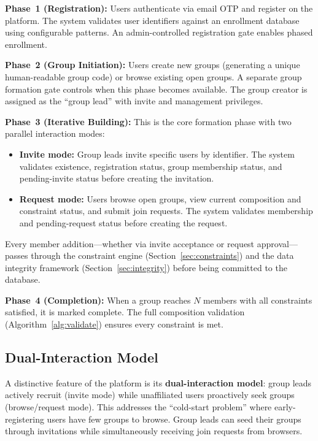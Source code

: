 \documentclass[11pt,a4paper]{article}
\theoremstyle{plain}
\theoremstyle{definition}
\begin{document}
\textbf{Phase~1 (Registration):} Users authenticate via email OTP and register on the platform. The system validates user identifiers against an enrollment database using configurable patterns. An admin-controlled registration gate enables phased enrollment.

\textbf{Phase~2 (Group Initiation):} Users create new groups (generating a unique human-readable group code) or browse existing open groups. A separate group formation gate controls when this phase becomes available. The group creator is assigned as the ``group lead'' with invite and management privileges.

\textbf{Phase~3 (Iterative Building):} This is the core formation phase with two parallel interaction modes:
\begin{itemize}[noitemsep,topsep=3pt]
    \item \textbf{Invite mode:} Group leads invite specific users by identifier. The system validates existence, registration status, group membership status, and pending-invite status before creating the invitation.
    \item \textbf{Request mode:} Users browse open groups, view current composition and constraint status, and submit join requests. The system validates membership and pending-request status before creating the request.
\end{itemize}
Every member addition---whether via invite acceptance or request approval---passes through the constraint engine (Section~\ref{sec:constraints}) and the data integrity framework (Section~\ref{sec:integrity}) before being committed to the database.

\textbf{Phase~4 (Completion):} When a group reaches $N$ members with all constraints satisfied, it is marked complete. The full composition validation (Algorithm~\ref{alg:validate}) ensures every constraint is met.

\subsection{Dual-Interaction Model}

A distinctive feature of the platform is its \textbf{dual-interaction model}: group leads actively recruit (invite mode) while unaffiliated users proactively seek groups (browse/request mode). This addresses the ``cold-start problem'' where early-registering users have few groups to browse. Group leads can seed their groups through invitations while simultaneously receiving join requests from browsers.
\end{document}
